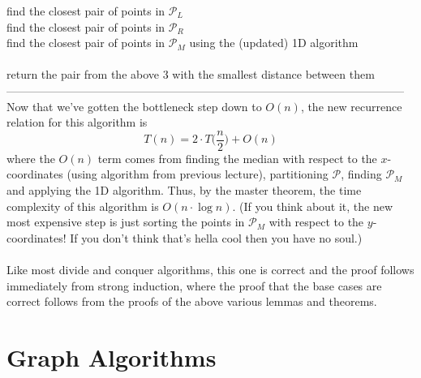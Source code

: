 \documentclass{article}
\newcommand{\x}{\cdot}
\newcommand{\mcal}[1]{\mathcal{#1}}
\begin{document}
	\hspace*{7mm} find the closest pair of points in $\mcal{P}_L$\\
	\hspace*{7mm} find the closest pair of points in $\mcal{P}_R$\\
	\hspace*{7mm} find the closest pair of points in $\mcal{P}_M$ using the (updated) 1D algorithm\\\\
	\hspace*{7mm} return the pair from the above 3 with the smallest distance between them\\
---------------------------------------------------------------------------------------------------------\\
Now that we've gotten the bottleneck step down to $O(n)$, the new recurrence relation for this algorithm is
\[T(n) = 2\x T\Big(\frac{n}{2}\Big) + O(n)\]
where the $O(n)$ term comes from finding the median with respect to the $x$-coordinates (using algorithm from previous lecture), partitioning $\mcal{P}$, finding $\mcal{P}_M$ and applying the 1D algorithm. Thus, by the master theorem, the time complexity of this algorithm is $O(n\x \log n)$. (If you think about it, the new most expensive step is just sorting the points in $\mcal{P}_M$ with respect to the $y$-coordinates! If you don't think that's hella cool then you have no soul.)\\\\
Like most divide and conquer algorithms, this one is correct and the proof follows immediately from strong induction, where the proof that the base cases are correct follows from the proofs of the above various lemmas and theorems.
\newpage

\section{Graph Algorithms}
\end{document}

